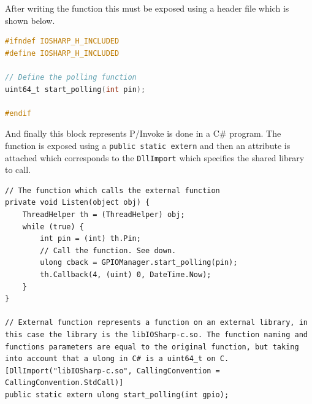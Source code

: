 After writing the function this must be exposed using a header file which is shown below.
\begin{lstlisting}[language=C, caption={IOSharp.h - Header file for the library}]
#ifndef IOSHARP_H_INCLUDED
#define IOSHARP_H_INCLUDED

// Define the polling function
uint64_t start_polling(int pin);

#endif
\end{lstlisting}
And finally this block represents P/Invoke is done in a C\# program. The function is exposed using a \verb!public static extern! and then an attribute is attached which corresponds to the \verb!DllImport! which specifies the shared library to call.
\begin{lstlisting}[language=CSharp, caption={GPIOManager.cs - P/Invoke section}]
// The function which calls the external function
private void Listen(object obj) {
    ThreadHelper th = (ThreadHelper) obj;
    while (true) {
        int pin = (int) th.Pin;
        // Call the function. See down.
        ulong cback = GPIOManager.start_polling(pin);
        th.Callback(4, (uint) 0, DateTime.Now);
    }
}

// External function represents a function on an external library, in this case the library is the libIOSharp-c.so. The function naming and functions parameters are equal to the original function, but taking into account that a ulong in C# is a uint64_t on C.
[DllImport("libIOSharp-c.so", CallingConvention = CallingConvention.StdCall)]
public static extern ulong start_polling(int gpio);
\end{lstlisting}

